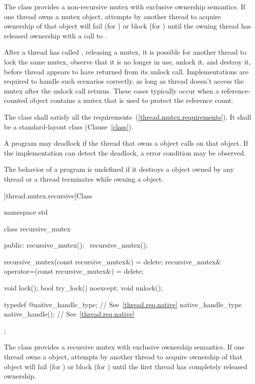 \pnum
The class  provides a non-recursive mutex with exclusive ownership
semantics. If one thread owns a mutex object, attempts by another thread to acquire
ownership of that object will fail (for ) or block (for
) until the owning thread has released ownership with a call to
.

\pnum
\enternote
After a thread  has called , releasing a mutex, it is possible for another
thread  to lock the same mutex, observe that it is no longer in use, unlock it, and
destroy it, before thread  appears to have returned from its unlock call. Implementations
are required to handle such scenarios correctly, as long as thread  doesn't access the
mutex after the unlock call returns. These cases typically occur when a reference-counted object
contains a mutex that is used to protect the reference count.
\exitnote

\pnum
The class  shall satisfy all the 
requirements~(\ref{thread.mutex.requirements}). It shall be a standard-layout
class (Clause~\ref{class}).

\pnum
\enternote A program may deadlock if the thread that owns a  object calls
 on that object. If the implementation can detect the deadlock,
a  error condition may be observed. \exitnote

\pnum
The behavior of a program is undefined if
it destroys a  object owned by any thread or
a thread terminates while owning a  object.

[thread.mutex.recursive]{Class }

\begin{codeblock}
namespace std {
  class recursive_mutex {
  public:
    recursive_mutex();
    ~recursive_mutex();

    recursive_mutex(const recursive_mutex&) = delete;
    recursive_mutex& operator=(const recursive_mutex&) = delete;

    void lock();
    bool try_lock() noexcept;
    void unlock();

    typedef @\impdef@ native_handle_type; // See~\ref{thread.req.native}
    native_handle_type native_handle();                // See~\ref{thread.req.native}
  };
}
\end{codeblock}

\pnum
The class  provides a recursive mutex with exclusive ownership
semantics. If one thread owns a  object, attempts by another
thread to acquire ownership of that object will fail (for ) or block
(for ) until the first thread has completely released ownership.

